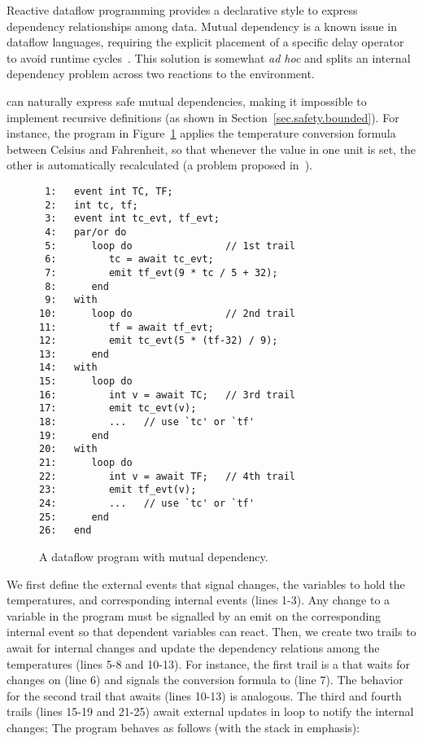 Reactive dataflow programming \cite{frp.survey} provides a declarative style to 
express dependency relationships among data.
Mutual dependency is a known issue in dataflow languages, requiring the 
explicit placement of a specific delay operator to avoid runtime
cycles~\cite{frtime.embedding,luagravity.sblp}.
This solution is somewhat \emph{ad hoc} and splits an internal dependency 
problem across two reactions to the environment.

\CEU can naturally express safe mutual dependencies, making it impossible to 
implement recursive definitions (as shown in Section~\ref{sec.safety.bounded}).
For instance, the program in Figure~\ref{lst:ceu:frp:2} applies the temperature 
conversion formula between Celsius and Fahrenheit, so that whenever the value 
in one unit is set, the other is automatically recalculated (a problem proposed 
in~\cite{frp.survey}).

\begin{figure}[t]
{\small
\begin{verbatim}
 1:   event int TC, TF;
 2:   int tc, tf;
 3:   event int tc_evt, tf_evt;
 4:   par/or do
 5:      loop do                // 1st trail
 6:         tc = await tc_evt;
 7:         emit tf_evt(9 * tc / 5 + 32);
 8:      end
 9:   with
10:      loop do                // 2nd trail
11:         tf = await tf_evt;
12:         emit tc_evt(5 * (tf-32) / 9);
13:      end
14:   with
15:      loop do
16:         int v = await TC;   // 3rd trail
17:         emit tc_evt(v);
18:         ...   // use `tc' or `tf'
19:      end
20:   with
21:      loop do
22:         int v = await TF;   // 4th trail
23:         emit tf_evt(v);
24:         ...   // use `tc' or `tf'
25:      end
26:   end
\end{verbatim}
}%
\caption{ A dataflow program with mutual dependency.
\label{lst:ceu:frp:2}
}
\end{figure}

We first define the external events that signal changes, the variables to hold 
the temperatures, and corresponding internal events (lines 1-3).
Any change to a variable in the program must be signalled by an emit on the 
corresponding internal event so that dependent variables can react.
Then, we create two trails to await for internal changes and update the 
dependency relations among the temperatures (lines 5-8 and 10-13).
For instance, the first trail is a  that waits for changes on 
 (line 6) and signals the conversion formula to  
(line 7).
The behavior for the second trail that awaits  (lines 10-13) is 
analogous.
The third and fourth trails (lines 15-19 and 21-25) await external updates in
loop to notify the internal changes;
The program behaves as follows (with the stack in emphasis):

